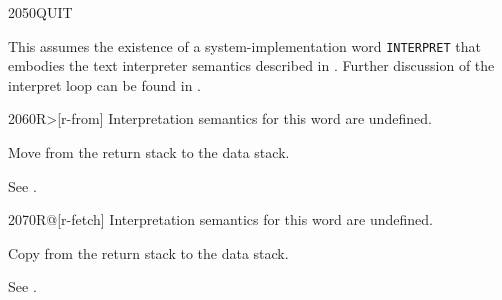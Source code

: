\begin{worddef}{2050}{QUIT}
\begin{implement}
		\dffamily
		This assumes the existence of a system-implementation word
		\texttt{INTERPRET} that embodies the text interpreter semantics
		described in .
		Further discussion of the interpret loop can be found in
		.
	\end{implement}
\end{worddef}

\vspace*{-1ex}
\begin{worddef}[Rfrom]{2060}{R>}[r-from]
\interpret
	Interpretation semantics for this word are undefined.

\execute

	Move  from the return stack to the data stack.


	\begin{testing} %
		See .
	\end{testing}
\end{worddef}

\vspace*{-1ex}
\begin{worddef}{2070}{R@}[r-fetch]
\interpret
	Interpretation semantics for this word are undefined.

\execute

	Copy  from the return stack to the data stack.


	\begin{testing} %
		See .
	\end{testing}
\end{worddef}


